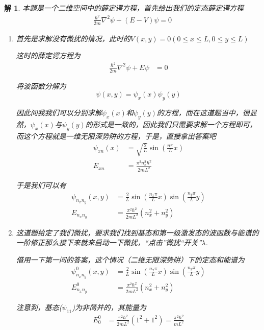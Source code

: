 \documentclass{article}
\newtheorem{solution}{解}
\begin{document}
\begin{solution}
    本题是一个二维空间中的薛定谔方程，首先给出我们的定态薛定谔方程
    \begin{align*}
        \frac{\hbar^2}{2m}\nabla^2\psi+(E-V)\psi=0
    \end{align*}

    \begin{enumerate}
        \item 首先是求解没有微扰的情况，此时的$V(x,y)=0(0\leq x \leq L,0\leq y\leq L)$
        
        这时的薛定谔方程为
        \begin{align*}
            \frac{\hbar^2}{2m}\nabla^2\psi+E\psi&=0
        \end{align*}

        将波函数分解为
        \[
            \psi(x,y)=\psi_x(x)\psi_y(y)
        \]

        因此问我我们可以分别求解$\psi_x(x)$和$\psi_y(y)$的方程，而在这道题当中，很显然，$\psi_x(x)$与$\psi_y(y)$的形式是一致的，因此我们只需要求解一个方程即可，而这个方程就是一维无限深势阱的方程，于是，直接拿出答案吧
        \begin{align*}
            \psi_{xn}(x)&=\sqrt{\frac{2}{L}}\sin(\frac{n\pi}{L}x)\\
            E_{xn}&=\frac{\pi^2n_x^2\hbar^2}{2mL^2}
        \end{align*}

        于是我们可以有
        \begin{align*}
            \psi_{n_xn_y}(x,y)&=\frac{2}{L}\sin(\frac{n_x\pi}{L}x)\sin(\frac{n_y\pi}{L}y)\\
            E_{n_xn_y}&=\frac{\pi^2\hbar^2}{2mL^2}(n_x^2+n_y^2)
        \end{align*}
        \item 这道题给定了我们微扰，要求我们找到基态和第一级激发态的波函数与能谱的一阶修正那么接下来就来启动一下微扰，“点击”微扰“开关”$\lambda$.
        
        借用一下第一问的答案，这个情况（二维无限深势阱）下的定态和能谱为
        \begin{align*}
            \psi_{n_xn_y}^0(x,y)&=\frac{2}{L}\sin(\frac{n_x\pi}{L}x)\sin(\frac{n_y\pi}{L}y)\\
            E_{n_xn_y}^0&=\frac{\pi^2\hbar^2}{2mL^2}(n_x^2+n_y^2)
        \end{align*}
        
        注意到，基态($\psi_{11}$)为非简并的，其能量为
        \begin{align*}
            E_0^0&=\frac{\pi^2\hbar^2}{2mL^2}(1^2+1^2)=\frac{\pi^2\hbar^2}{mL^2}
        \end{align*}


\end{enumerate}
\end{solution}
\end{document}
